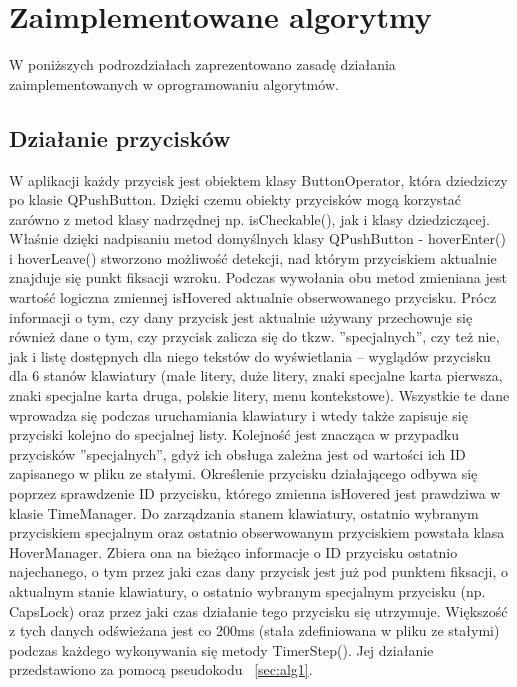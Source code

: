 \documentclass[twoside,a4paper]{book}
\begin{document}
\chapter{Zaimplementowane algorytmy}
W poniższych podrozdziałach zaprezentowano zasadę działania zaimple\-men\-towanych w oprogramowaniu algorytmów. 
\section{Działanie przycisków}
W aplikacji każdy przycisk jest obiektem klasy ButtonOperator, która dzie\-dzi\-czy po klasie QPushButton. Dzięki czemu obiekty przycisków mogą ko\-rzy\-stać zarówno z metod klasy nadrzędnej np. isCheckable(), jak i klasy dzie\-dzi\-czącej. Właśnie dzięki nadpisaniu metod domyślnych klasy QPushButton  -  ho\-ver\-Enter() i hoverLeave() stworzono możliwość detekcji, nad którym przyciskiem aktualnie znajduje się punkt fiksacji wzroku. Podczas wywołania obu metod zmieniana jest wartość logiczna zmiennej isHovered aktualnie obserwowanego przycisku.  Prócz informacji o tym, czy dany przycisk jest aktualnie używany przechowuje się również dane o tym, czy przycisk zalicza się do tkzw. ''spe\-cja\-lnych'', czy też nie, jak i listę dostępnych dla niego tekstów do wy\-świe\-tla\-nia – wyglądów przycisku dla 6 stanów kla\-wia\-tu\-ry (małe litery, duże litery, znaki specjalne karta pierwsza, znaki specjalne karta druga, polskie litery, menu kontekstowe). Wszystkie te dane wprowadza się podczas  uruchamiania kla\-wia\-tu\-ry i wtedy także zapisuje się przyciski kolejno do specjalnej listy. Kolejność jest znacząca w przypadku przycisków ''specjalnych'', gdyż ich obsługa zależna jest od wartości ich ID zapisanego w pliku ze stałymi. 
Określenie przycisku działającego odbywa się poprzez sprawdzenie ID przycisku, którego zmienna isHovered jest prawdziwa w klasie TimeManager. Do zarządzania stanem kla\-wia\-tu\-ry, ostatnio wybranym przyciskiem specjalnym oraz ostatnio obserwowanym przyciskiem powstała klasa HoverManager. Zbiera ona na bieżąco informacje o  ID przycisku ostatnio najechanego, o tym przez jaki czas dany przycisk jest już pod punktem fiksacji, o aktualnym stanie kla\-wia\-tu\-ry, o os\-ta\-tnio wybranym spe\-cja\-lnym przycisku (np. CapsLock) oraz przez jaki czas działanie tego przycisku się utrzymuje. Większość z tych danych odświeżana jest co 200ms (stała zdefiniowana w pliku ze stałymi) podczas każdego wykonywania się metody TimerStep(). Jej działanie przedstawiono za pomocą pseudokodu ~\ref{sec:alg1}.
\end{document}
